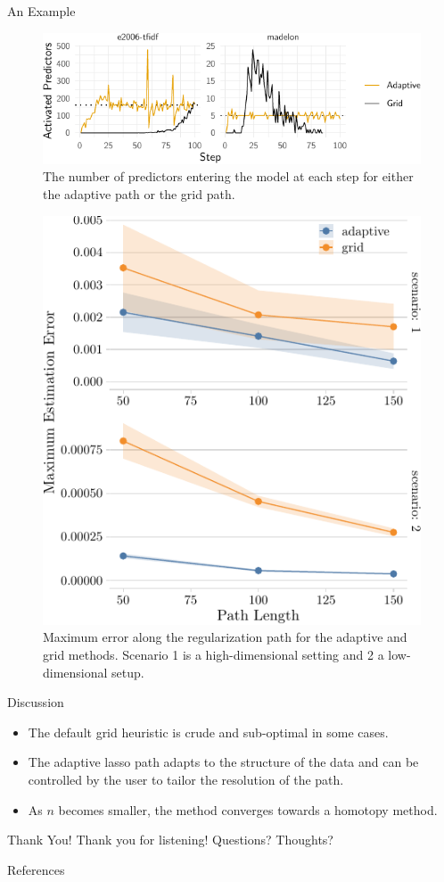 \begin{frame}{An Example}
  \begin{figure}
    \includegraphics{figures/case-study.pdf}
    \caption{The number of predictors entering the model at each step for
      either
      the adaptive path or the grid path.}
  \end{figure}
\end{frame}

\begin{frame}{}
  \begin{figure}
    \includegraphics[width=0.6\linewidth]{figures/max-error.pdf}
    \caption{Maximum error along the regularization path for the adaptive and
      grid methods. Scenario 1 is a high-dimensional setting and 2 a
      low-dimensional setup.}
  \end{figure}

\end{frame}

\begin{frame}{Discussion}
  \begin{itemize}
    \item The default grid heuristic is crude and sub-optimal in some cases.
    \item The adaptive lasso path adapts to the structure of the data and can be
      controlled by the user to tailor the resolution of the path.
    \item As \(n\) becomes smaller, the method converges towards a homotopy
      method.
  \end{itemize}
\end{frame}

\begin{frame}{Thank You!}
  Thank you for listening! Questions? Thoughts?
\end{frame}


\begin{frame}[allowframebreaks]{References}
  \bibliographytrue
  \printbibliography[heading=none]
\end{frame}



